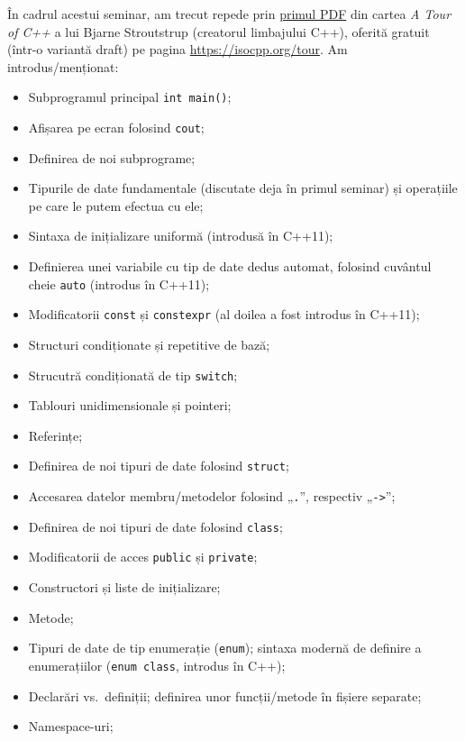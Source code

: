 În cadrul acestui seminar, am trecut repede prin \href{https://isocpp.org/images/uploads/2-Tour-Basics.pdf}{primul PDF} din cartea \emph{A Tour of C++} a lui Bjarne Stroutstrup (creatorul limbajului C++), oferită gratuit (într-o variantă draft) pe pagina \url{https://isocpp.org/tour}. Am introdus/menționat:
\begin{itemize}
    \item Subprogramul principal \texttt{int main()};
    \item Afișarea pe ecran folosind \texttt{cout};
    \item Definirea de noi subprograme;
    \item Tipurile de date fundamentale (discutate deja în primul seminar) și operațiile pe care le putem efectua cu ele;
    \item Sintaxa de inițializare uniformă (introdusă în C++11);
    \item Definierea unei variabile cu tip de date dedus automat, folosind cuvântul cheie \texttt{auto} (introdus în C++11);
    \item Modificatorii \texttt{const} și \texttt{constexpr} (al doilea a fost introdus în C++11); 
    \item Structuri condiționate și repetitive de bază;
    \item Strucutră condiționată de tip \texttt{switch};
    \item Tablouri unidimensionale și pointeri;
    \item Referințe;
    \item Definirea de noi tipuri de date folosind \texttt{struct};
    \item Accesarea datelor membru/metodelor folosind „\texttt{.}”, respectiv „\texttt{->}”;
    \item Definirea de noi tipuri de date folosind \texttt{class};
    \item Modificatorii de acces \texttt{public} și \texttt{private};
    \item Constructori și liste de inițializare;
    \item Metode;
    \item Tipuri de date de tip enumerație (\texttt{enum}); sintaxa modernă de definire a enumerațiilor (\texttt{enum class}, introdus în C++);
    \item Declarări vs.\ definiții; definirea unor funcții/metode în fișiere separate;
    \item Namespace-uri;
\end{itemize}

